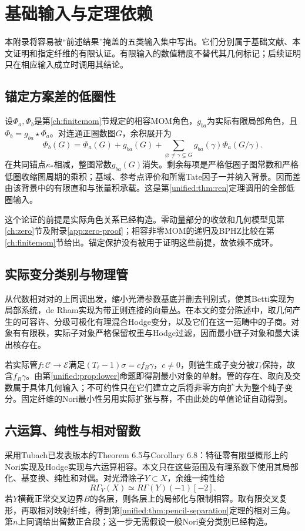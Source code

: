 \documentclass[11pt,a4paper,oneside]{ctexart}
\theoremstyle{cnplain}
\theoremstyle{definition}
\theoremstyle{remark}
\numberwithin{equation}{section}
\begin{document}
\appendix
\section{基础输入与定理依赖}\label{app:inputs}\label{app:evidence}
本附录将容易被“前述结果”掩盖的五类输入集中写出。它们分别属于基础文献、本文证明和指定纤维的有限认证。有限输入的数值精度不替代其几何标记；后续证明只在相应输入成立时调用其结论。

\subsection{锚定方案差的低圈性}
设$\Phi_a,\Phi_b$是第\ref{ch:finitemom}节规定的相容MOM角色，$g_{ba}$为实际有限局部角色，且$\Phi_b=g_{ba}\star\Phi_a$。对连通正圈数图$G$，余积展开为
\[
 \Phi_b(G)=\Phi_a(G)+g_{ba}(G)
 +\sum_{\varnothing\ne\gamma\subsetneq G}g_{ba}(\gamma)\Phi_a(G/\gamma).
\]
在共同锚点$\kappa_*$相减，整图常数$g_{ba}(G)$消失。剩余每项是严格低圈子图常数和严格低圈收缩图周期的乘积；基域、参考点评价和所需Tate因子一并纳入背景。因而差由该背景中的有限直和与张量积承载。这是第\ref{unified:thm:ren}定理调用的全部低圈输入。

这个论证的前提是实际角色关系已经构造。零动量部分的收敛和几何模型见第\ref{ch:zero}节及附录\ref{app:zero-proof}；相容非零MOM的递归及BPHZ比较在第\ref{ch:finitemom}节给出。锚定保护没有被用于证明这些前提，故依赖不成环。

\subsection{实际变分类别与物理管}
从代数相对对的上同调出发，缩小光滑参数基底并删去判别式，使其Betti实现为局部系统，de Rham实现为带正则连接的向量丛。在本文的变分陈述中，取几何产生的可容许、分级可极化有理混合Hodge变分，以及它们在这一范畴中的子商。对象有有限秩，实际子对象严格保留权重与Hodge过滤，因而最小链子对象和最大读出核存在。

若实际管$f:\mathcal C\to\mathcal E$满足$(T_\ell-1)\sigma=c f_B\gamma$，$c\ne0$，则链生成子变分被$T_\ell$保持，故含$f_B\gamma$。由第\ref{unified:prop:lower}命题即得割最小对象的单射。管的存在、取向及交数属于具体几何输入；不可约性只在它们建立之后将非零方向扩大为整个纯子变分。固定纤维的Nori最小性另用实际扩张与群，不由此处的单值论证自动得到。

\subsection{六运算、纯性与相对留数}
采用Tubach已发表版本的Theorem 6.5与Corollary 6.8\cite{tubach}：特征零有限型概形上的Nori实现及Hodge实现与六运算相容。本文只在这些范围及有理系数下使用其局部化、基变换、纯性和对偶。对光滑除子$Y\subset X$，余维一纯性给
\[
 R\Gamma_Y(X)\simeq R\Gamma(Y)(-1)[-2].
\]
若$Y$横截正常交叉边界$B$的各层，则各层上的局部化与限制相容。取有限交叉复形，再取相对映射纤维，得到第\ref{unified:thm:pencil-separation}定理的相对三角。第$n$上同调给出留数正合段；这一步无需假设一般Nori变分类别已经构造。
\end{document}
